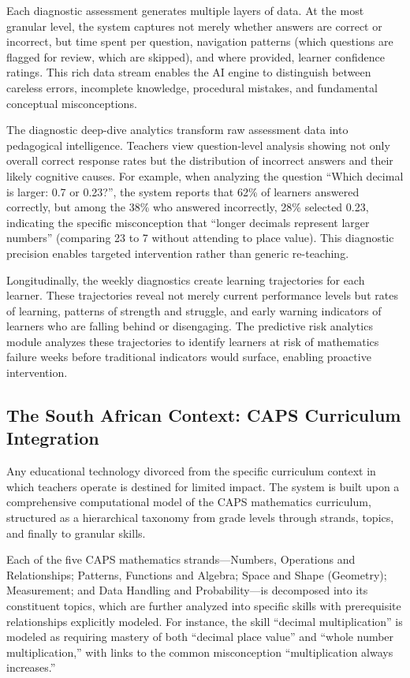 \documentclass[12pt,a4paper]{article}
\begin{document}
Each diagnostic assessment generates multiple layers of data. At the most granular level, the system captures not merely whether answers are correct or incorrect, but time spent per question, navigation patterns (which questions are flagged for review, which are skipped), and where provided, learner confidence ratings. This rich data stream enables the AI engine to distinguish between careless errors, incomplete knowledge, procedural mistakes, and fundamental conceptual misconceptions.

The diagnostic deep-dive analytics transform raw assessment data into pedagogical intelligence. Teachers view question-level analysis showing not only overall correct response rates but the distribution of incorrect answers and their likely cognitive causes. For example, when analyzing the question ``Which decimal is larger: 0.7 or 0.23?'', the system reports that 62\% of learners answered correctly, but among the 38\% who answered incorrectly, 28\% selected 0.23, indicating the specific misconception that ``longer decimals represent larger numbers'' (comparing 23 to 7 without attending to place value). This diagnostic precision enables targeted intervention rather than generic re-teaching.

Longitudinally, the weekly diagnostics create learning trajectories for each learner. These trajectories reveal not merely current performance levels but rates of learning, patterns of strength and struggle, and early warning indicators of learners who are falling behind or disengaging. The predictive risk analytics module analyzes these trajectories to identify learners at risk of mathematics failure weeks before traditional indicators would surface, enabling proactive intervention.

\subsection{The South African Context: CAPS Curriculum Integration}

Any educational technology divorced from the specific curriculum context in which teachers operate is destined for limited impact. The system is built upon a comprehensive computational model of the CAPS mathematics curriculum, structured as a hierarchical taxonomy from grade levels through strands, topics, and finally to granular skills.

Each of the five CAPS mathematics strands---Numbers, Operations and Relationships; Patterns, Functions and Algebra; Space and Shape (Geometry); Measurement; and Data Handling and Probability---is decomposed into its constituent topics, which are further analyzed into specific skills with prerequisite relationships explicitly modeled. For instance, the skill ``decimal multiplication'' is modeled as requiring mastery of both ``decimal place value'' and ``whole number multiplication,'' with links to the common misconception ``multiplication always increases.''
\end{document}
